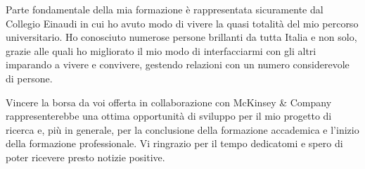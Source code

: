 \documentclass[11pt, a4paper]{dogear-cv}
\begin{document}
\begin{cvletter}
Parte fondamentale della mia formazione è rappresentata sicuramente dal Collegio Einaudi in cui ho avuto modo di vivere la quasi totalità del mio percorso universitario. Ho conosciuto numerose persone brillanti da tutta Italia e non solo, grazie alle quali ho migliorato il mio modo di interfacciarmi con gli altri imparando a vivere e convivere, gestendo relazioni con un numero considerevole di persone.

Vincere la borsa da voi offerta in collaborazione con McKinsey \& Company rappresenterebbe una ottima opportunità di sviluppo per il mio progetto di ricerca e, più in generale, per la conclusione della formazione accademica e l'inizio della formazione professionale.
Vi ringrazio per il tempo dedicatomi e spero di poter ricevere presto notizie positive.

\end{cvletter}


\makeletterclosing
\end{document}
